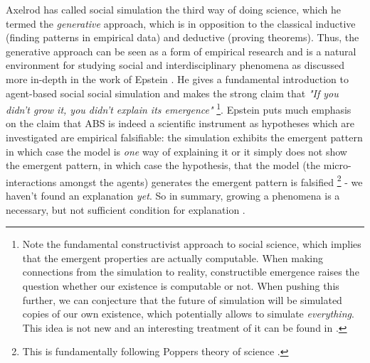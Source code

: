 Axelrod \cite{axelrod_advancing_1997, axelrod_guide_2006} has called social simulation the third way of doing science, which he termed the \textit{generative} approach, which is in opposition to the classical inductive (finding patterns in empirical data) and deductive (proving theorems). Thus, the generative approach can be seen as a form of empirical research and is a natural environment for studying social and interdisciplinary phenomena as discussed more in-depth in the work of Epstein \cite{epstein_chapter_2006, epstein_generative_2012}. He gives a fundamental introduction to agent-based social social simulation and makes the strong claim that \textit{"If you didn't grow it, you didn't explain its emergence"} \footnote{Note the fundamental constructivist approach to social science, which implies that the emergent properties are actually computable. When making connections from the simulation to reality, constructible emergence raises the question whether our existence is computable or not. When pushing this further, we can conjecture that the future of simulation will be simulated copies of our own existence, which potentially allows to simulate \textit{everything}. This idea is not new and an interesting treatment of it can be found in \cite{bostrom_are_2003, steinhart_theological_2010}.}. Epstein puts much emphasis on the claim that ABS is indeed a scientific instrument as hypotheses which are investigated are empirical falsifiable: the simulation exhibits the emergent pattern in which case the model is \textit{one} way of explaining it or it simply does not show the emergent pattern, in which case the hypothesis, that the model (the micro-interactions amongst the agents) generates the emergent pattern is falsified \footnote{This is fundamentally following Poppers theory of science \cite{popper_logic_2002}.} - we haven't found an explanation \textit{yet}. So in summary, growing a phenomena is a necessary, but not sufficient condition for explanation \cite{epstein_chapter_2006}.



